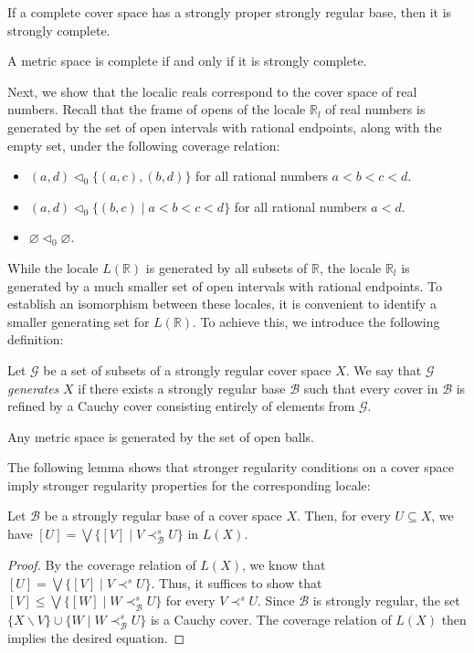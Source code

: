 \documentclass[reqno]{amsart}
\theoremstyle{definition}
\theoremstyle{remark}
\numberwithin{figure}{section}
\newcommand{\rb}{\prec}
\begin{document}
\begin{cor}
If a complete cover space has a strongly proper strongly regular base, then it is strongly complete.
\end{cor}

\begin{cor}
A metric space is complete if and only if it is strongly complete.
\end{cor}

Next, we show that the localic reals correspond to the cover space of real numbers.
Recall that the frame of opens of the locale $\mathbb{R}_l$ of real numbers is generated by the set of open intervals with rational endpoints, along with the empty set, under the following coverage relation:
\begin{itemize}
\item $(a,d) \triangleleft_0 \{ (a,c), (b,d) \}$ for all rational numbers $a < b < c < d$.
\item $(a,d) \triangleleft_0 \{ (b,c) \mid a < b < c < d \}$ for all rational numbers $a < d$.
\item $\varnothing \triangleleft_0 \varnothing$.
\end{itemize}

While the locale $L(\mathbb{R})$ is generated by all subsets of $\mathbb{R}$, the locale $\mathbb{R}_l$ is generated by a much smaller set of open intervals with rational endpoints.
To establish an isomorphism between these locales, it is convenient to identify a smaller generating set for $L(\mathbb{R})$.
To achieve this, we introduce the following definition:

\begin{defn}
Let $\mathcal{G}$ be a set of subsets of a strongly regular cover space $X$.
We say that $\mathcal{G}$ \emph{generates} $X$ if there exists a strongly regular base $\mathcal{B}$ such that every cover in $\mathcal{B}$ is refined by a Cauchy cover consisting entirely of elements from $\mathcal{G}$.
\end{defn}

\begin{example}
Any metric space is generated by the set of open balls.
\end{example}

The following lemma shows that stronger regularity conditions on a cover space imply stronger regularity properties for the corresponding locale:

\begin{lem}
Let $\mathcal{B}$ be a strongly regular base of a cover space $X$.
Then, for every $U \subseteq X$, we have $[U] = \bigvee \{ [V] \mid V \rb^s_\mathcal{B} U \}$ in $L(X)$.
\end{lem}
\begin{proof}
By the coverage relation of $L(X)$, we know that $[U] = \bigvee \{ [V] \mid V \rb^s U \}$.
Thus, it suffices to show that $[V] \leq \bigvee \{ [W] \mid W \rb^s_\mathcal{B} U \}$ for every $V \rb^s U$.
Since $\mathcal{B}$ is strongly regular, the set $\{ X \backslash V \} \cup \{ W \mid W \rb^s_\mathcal{B} U \}$ is a Cauchy cover.
The coverage relation of $L(X)$ then implies the desired equation.
\end{proof}
\end{document}
